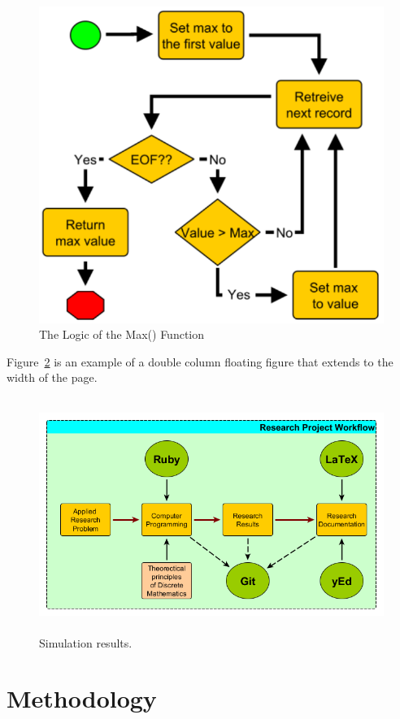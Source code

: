 \documentclass[journal,12pt]{IEEEtran}
\begin{document}
\begin{figure}[htb]
\centering
\includegraphics[width=0.8\columnwidth]{img/flowchart.pdf}
\caption{The Logic of the Max() Function}
\label{fig_flowchart}
\end{figure}

Figure~\ref{fig_doublecolumn} is an example of a double column floating figure that extends to the width of the page.

\begin{figure}[!t]
\centering
\includegraphics[width=\textwidth,height=3in]{img/researchprojectWork.png}%
\caption{Simulation results.}
\label{fig_doublecolumn}
\end{figure}


\section{Methodology}
\end{document}
